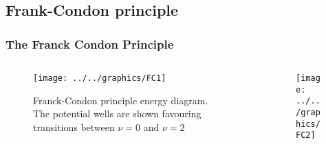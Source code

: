\documentclass[a4paper,titlepage]{article}
\begin{document}
\subsection{Frank-Condon principle}

\begin{frame}[shrink]
\frametitle{The Franck Condon Principle}
\begin{columns}[onlytextwidth]
\begin{column}{.3\linewidth}
\begin{figure}[h!]
\texttt{[image: ../../graphics/FC1]}
\caption{\footnotesize Franck-Condon principle energy diagram. The potential wells are shown favouring transitions between \(\nu = 0\) and \(\nu = 2\)}
\end{figure}
\end{column}
\begin{column}{.6\linewidth}
\begin{figure}[h!]
\texttt{[image: ../../graphics/FC2]}
\end{figure}
\end{column}
\end{columns}
\end{frame}
\end{document}
